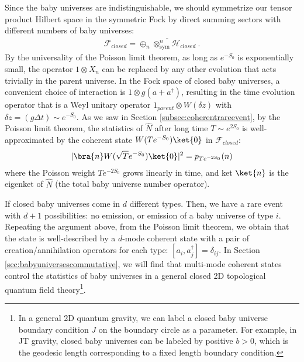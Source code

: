 \documentclass[a4paper,11pt]{article}
\theoremstyle{definition}
\numberwithin{equation}{section}
\newcommand{\mH}{\mathcal{H}}
\begin{document}
 Since the baby universes are indistinguishable, we should symmetrize our tensor product Hilbert space in the symmetric Fock by direct summing sectors with different numbers of baby universes: 
  \begin{eqnarray}
      \mathcal{F}_{closed} =\overline{\oplus_n \otimes_\text{sym}^n\mH_{closed}}\ .
  \end{eqnarray}
By the universality of the Poisson limit theorem, as long as $e^{-S_0}$  is exponentially small, the operator $1\otimes X_n$ can be replaced by any other evolution that acts trivially in the parent universe. In the Fock space of closed baby universes, a convenient choice of interaction is $1\otimes g(a+a^\dagger)$, resulting in the time evolution operator that is a Weyl unitary operator $1_{parent}\otimes W(\delta z)$ with $\delta z=(g \Delta t)\sim e^{-S_0}$. 
As we saw in Section \ref{subsec:coherentrareevent}, by the Poisson limit theorem, the statistics of $\hat{N}$ after long time $T\sim e^{2S_0}$ is well-approximated by the coherent state $W(Te^{-S_0})\ket{0}$ in $\mathcal{F}_{closed}$:
  \begin{eqnarray}
      |\bra{n}W(\sqrt{T}e^{-S_0})\ket{0}|^2=p_{Te^{-2S_0}}(n)
  \end{eqnarray}
  where the Poisson weight $Te^{-2S_0}$ grows linearly in time, and ket $\ket{n}$ is the eigenket of $\hat{N}$ (the total baby universe number operator).


If closed baby universes come in $d$ different types. Then, we have a rare event with $d+1$ possibilities: no emission, or emission of a baby universe of type $i$. Repeating the argument above, from the Poisson limit theorem, we obtain that the state is well-described by a $d$-mode coherent state with a pair of creation/annihilation operators for each type: $[a_i,a^\dagger_j]=\delta_{ij}$. In Section \ref{sec:babyuniversescommutative}, we will find that multi-mode coherent states control the statistics of baby universes in a general closed 2D topological quantum field theory\footnote{In a general 2D quantum gravity, we can label a closed baby universe boundary condition $J$ on the boundary circle as a parameter. For example, in JT gravity, closed baby universes can be labeled by positive $b>0$, which is the geodesic length corresponding to a fixed length boundary condition.}.
\end{document}
